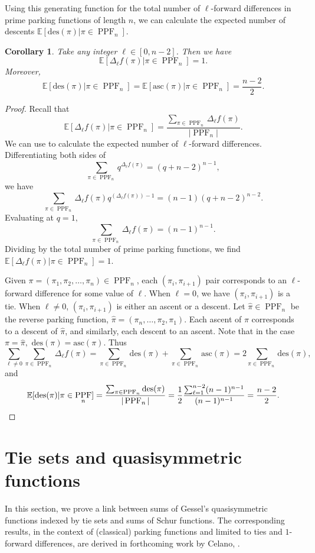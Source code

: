 \documentclass[12pt,reqno]{amsart}
\newtheorem{corollary}[theorem]{Corollary}
\theoremstyle{definition}
\newcommand{\E}{\mathbb{E}}
\theoremstyle{remark}
\newcommand{\fd}{\Delta_{\ell} f}
\newcommand{\des}{\mathrm{des}}
\newcommand{\asc}{\mathrm{asc}}
\DeclareMathOperator{\PPF}{PPF}
\begin{document}
Using this generating function for the total number of $\ell$-forward differences in prime parking functions of length $n$, we can calculate the expected number of descents $\E[\des(\pi)|\pi\in\PPF_n].$ 

\begin{corollary}
    Take any 
    integer $\ell \in [0, n-2]$. Then we have $$\E[\fd(\pi)|\pi\in \PPF_n]=1.$$ Moreover, $$\E[{\des}(\pi)|\pi\in\PPF_n]=\E[\asc(\pi)|\pi\in\PPF_n]=\frac{n-2}{2}.$$
\end{corollary}
\begin{proof}
  Recall that  $$\E[\fd(\pi)|\pi\in \PPF_n]= \frac{\sum_{\pi \in \PPF_n} \fd(\pi)}{|\PPF_n|}.$$
  We can use  to calculate the expected number of $\ell$-forward differences. Differentiating both sides of
    \begin{equation*}
        \sum_{\pi\in\PPF_n}q^{\fd(\pi)}=(q+n-2)^{n-1},
    \end{equation*} we have $$\sum_{\pi\in\PPF_n}\fd(\pi)q^{(\fd(\pi)) -1}=(n-1)(q+n-2)^{n-2}.$$ Evaluating at $q=1,$ 
    $$\sum_{\pi\in\PPF_n}\fd(\pi)=(n-1)^{n-1}.$$  
    Dividing by the total number of prime parking functions, we find $\E[\fd(\pi)|\pi\in \PPF_n]=1$. 

Given $\pi=(\pi_1,\pi_2,\ldots,\pi_n)\in \PPF_n$, each $(\pi_i,\pi_{i+1})$ pair corresponds to an $\ell$-forward difference for some value of $\ell$.  When $\ell=0$, we have $(\pi_i,\pi_{i+1})$ is a tie.  When $\ell\not=0$, $(\pi_i,\pi_{i+1})$ is either an ascent or a descent.  Let $\hat{\pi}\in \PPF_n$ be the reverse parking function, $\hat{\pi}=(\pi_n,\ldots, \pi_2,\pi_1).$  Each ascent of $\pi$ corresponds to a descent of $\hat{\pi}$, and similarly, each descent to an ascent.  Note that in the case $\pi=\hat{\pi},$ $\des(\pi)=\asc(\pi).$  Thus $$\sum_{\ell\not=0}\sum_{\pi\in\PPF_n}\fd(\pi)=\sum_{\pi\in\PPF_n}\des(\pi)+\sum_{\pi\in\PPF_n}\asc(\pi)=2\sum_{\pi\in\PPF_n}\des(\pi),$$ and \[\E[\des(\pi)|\pi\in\PPF_n]=\frac{\sum_{\pi\in\PPF_n}\des(\pi)}{|\PPF_n|}=\frac{1}{2}\frac{\sum_{\ell=1}^{n-2}(n-1)^{n-1}}{(n-1)^{n-1}}=\frac{n-2}{2}.\qedhere\]        
\end{proof}

\section{Tie sets and quasisymmetric functions}\label{sec: TieSets QuasiSymm}

In this section, we prove a link between sums of Gessel's quasisymmetric functions indexed by tie sets and sums of Schur functions.  The corresponding results, in the context of (classical) parking functions and limited to ties and $1$-forward differences, are derived in forthcoming work by Celano, \cite{Celano:SchurPositivity}.
\end{document}
